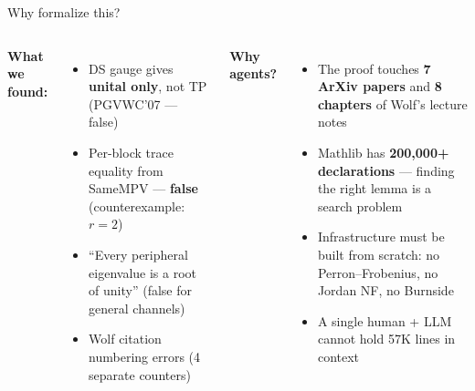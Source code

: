 \documentclass[aspectratio=169,10pt]{beamer}
\begin{document}
\begin{frame}{Why formalize this?}
    \begin{columns}[T]
        \textcolor{leangreen}{\textbf{What we found:}}
        \begin{itemize}
            \item[\textcolor{softred}{$\boldsymbol{\times}$}] DS gauge gives \textbf{unital only}, not TP {\scriptsize(PGVWC'07 --- false)}
            \item[\textcolor{softred}{$\boldsymbol{\times}$}] Per-block trace equality from SameMPV --- \textbf{false} {\scriptsize(counterexample: $r\!=\!2$)}
            \item[\textcolor{softred}{$\boldsymbol{\times}$}] ``Every peripheral eigenvalue is a root of unity'' {\scriptsize(false for general channels)}
            \item[\textcolor{softred}{$\boldsymbol{\times}$}] Wolf citation numbering errors {\scriptsize(4 separate counters)}
        \end{itemize}
        \textcolor{leangreen}{\textbf{Why agents?}}
        \begin{itemize}
            \item The proof touches \textbf{7 ArXiv papers} and \textbf{8 chapters} of Wolf's lecture notes
            \item Mathlib has \textbf{200{,}000+ declarations} --- finding the right lemma is a search problem
            \item Infrastructure must be built from scratch: no Perron--Frobenius, no Jordan NF, no Burnside
            \item A single human + LLM cannot hold 57K lines in context
        \end{itemize}
    \end{columns}
\end{frame}
\end{document}
